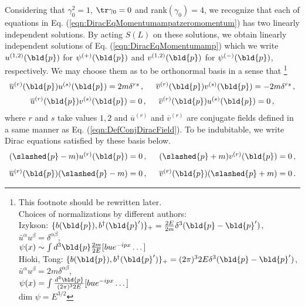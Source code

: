 Considering that $\gamma_0^2 =1$, $\tr \gamma_0 = 0$ and rank$(\gamma_0) = 4$,
we recognize that each of equations in Eq. (\ref{eqn:DiracEqMomentumampatzeromomentum})
has  two  linearly independent solutions.
By acting $S(L)$ on 
these solutions, we obtain linearly independent solutions of Eq. (\ref{eqn:DiracEqMomentumamp})
which we write $u^{(1, 2)}(\bld{p})$ for $\psi^{(+)}(\bld{p})$ and $v^{(1,2)}(\bld{p})$
 for $\psi^{(-)}(\bld{p})$, respectively. 
We may choose them as to be orthonormal basis in a sense that
\footnote{%
This footnote should be rewritten later.\\
Choices of normalizations by different authors:\\
Izykson: $\{ b(\bld{p}),b^\dagger(\bld{p}') \}_+ = \frac{2E}{2m}\delta^3(\bld{p}-\bld{p}')$,
$\bar{u}^\alpha u^\beta = \delta^{\alpha \beta}$,\\
\hspace{20mm}$\psi(x) \sim \int d^3\bld{p}\frac{2m}{2E}[ b u e^{-ipx} \dots]$\\
Hioki, Tong: $\{ b(\bld{p}),b^\dagger(\bld{p}') \}_+ = (2\pi)^3 2E\delta^3(\bld{p}-\bld{p}')$,
$\bar{u}^\alpha u^\beta = 2m \delta^{\alpha \beta}$,\\
\hspace{20mm}$\psi(x) = \int \frac{d^3\bld{p}}{(2\pi)^32E}[ b u e^{-ipx} \dots]$\\
dim $\psi = E^{3/2}$
}%
\begin{eqnarray}
\begin{array}{c}
\overline{u}^{(r)}(\bld{p})
u^{(s)}(\bld{p})
= 2m \delta^{rs}\,,
\hspace{5mm}
\overline{v}^{(r)}(\bld{p})
v^{(s)}(\bld{p})
= -2m \delta^{rs}\,,
\vspace{2mm}
\\
\overline{u}^{(r)}(\bld{p})
v^{(s)}(\bld{p})
= 0\,,
\hspace{5mm}
\overline{v}^{(r)}(\bld{p})
u^{(s)}(\bld{p})
= 0 \,,
\end{array}
\label{eqn:DiracspinorNormalization}
\end{eqnarray}
where $r$ and $s$ take values $1, 2$ and
$\overline{u}^{(r)}$  and $\overline{v}^{(r)}$ 
are conjugate fields defined in a same manner as Eq. (\ref{eqn:DefConjDiracField}).
To be indubitable, we write Dirac equations satisfied by these basis below.
\begin{eqnarray}
\begin{array}{l}
(\slashed{p} - m) u^{(r)}(\bld{p}) = 0\,,
\hspace{5mm}
(\slashed{p} + m) v^{(r)}(\bld{p}) = 0\,,
\vspace{3mm}
\\
\overline{u}^{(r)}(\bld{p}) (\slashed{p} - m) = 0\,,
\hspace{5mm}
\overline{v}^{(r)}(\bld{p}) (\slashed{p} + m) = 0\,.
\end{array}
\label{eqn:DiracEqDiracspinors}
\end{eqnarray}
